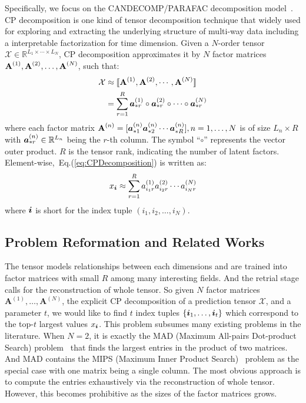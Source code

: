 \documentclass[10pt,journal,compsoc]{IEEEtran}
\newcommand{\Sca}[3]{{#1}^{(#2)}_{i_#2#3}}%
\newcommand{\anr}[2]{\Sca{a}{#1}{#2}}
\newcommand{\T}[1]{\mathcal{#1}}
\newcommand{\KT}[1]{\llbracket #1 \rrbracket}
\newcommand{\V}[1]{{\boldsymbol{{\MakeLowercase{#1}}}}}
\newcommand{\ColVec}[3]{\V{#1}^{(#2)}_{#3}}
\newcommand{\ColVecA}[1]{\V{a}^{(#1)}_{*r}}
\newcommand{\M}[1]{{\textbf{{\MakeUppercase{#1}}}}}
\newcommand{\FacMat}[2]{\M{#1}^{(#2)}}
\newcommand{\Eqn}[1]{Eq.(\ref{eq:#1})}
\begin{document}
Specifically, we focus on the CANDECOMP/PARAFAC decomposition model~\cite{KoBa09,AcarYener09}. CP decomposition is one kind of tensor decomposition technique that widely used for exploring and extracting the underlying structure of multi-way data including a interpretable factorization for time dimension. Given a $N$-order tensor $\T{X}\in\mathbb{R}^{L_1\times \cdots\times L_N}$, CP decomposition approximates it by $N$ factor matrices $\FacMat{A}{1},\FacMat{A}{2},\ldots,\FacMat{A}{N}$, such that:
\begin{align}
\label{eq:CPDecomposition}
\T{X}&\approx\KT{\FacMat{A}{1},\FacMat{A}{2},\cdots,\FacMat{A}{N}} \\ \notag
&=\sum_{r=1}^R\ColVecA{1}\circ\ColVecA{2}\circ\cdots\circ\ColVecA{N}
\end{align}
where each factor matrix $\FacMat{A}{n}=[\ColVec{a}{n}{*1}\ColVec{a}{n}{*2}\cdots\ColVec{a}{n}{*R}], n=1,\ldots,N$ is of size $L_n\times R$ with $\ColVec{a}{n}{*r}\in\mathbb{R}^{L_n}$ being the $r$-th column. The symbol ``$\circ$'' represents the vector outer product. $R$ is the tensor rank, indicating the number of latent factors. Element-wise,~\Eqn{CPDecomposition} is written as:
\begin{align}
\label{eq:CPValue}
x_\V{i} \approx \sum_{r=1}^{R}\anr{1}{r}\anr{2}{r}\cdots\anr{N}{r}
\end{align}
where $\V{i}$ is short for the index tuple $(i_1,i_2,\ldots,i_N)$.


\subsection{Problem Reformation and Related Works}
The tensor models relationships between each dimensions and are trained into factor matrices with small $R$ among many interesting fields. And the retrial stage calls for the reconstruction of whole tensor. So given $N$ factor matrices $\textbf{A}^{(1)},\ldots,\textbf{A}^{(N)}$, the explicit CP decomposition of a prediction tensor $\T{X}$, and a parameter $t$, we would like to find $t$ index tuples $\{\V{i}_1,\ldots,\V{i}_t\}$ which correspond to the top-$t$ largest values $x_{\V{i}}$. This problem subsumes many existing problems in the literature.
When $N=2$, it is exactly the MAD (Maximum All-pairs Dot-product Search) problem~\cite{BaPiKoSe15}
that finds the largest entries in the product of two matrices.
And MAD contains the MIPS (Maximum Inner Product Search)~\cite{Cohen97} problem
as the special case with one matrix being a single column. The most obvious approach is to compute the entries exhaustively via the reconstruction of whole tensor.
However, this becomes prohibitive as the sizes of the factor matrices grows.
\end{document}
